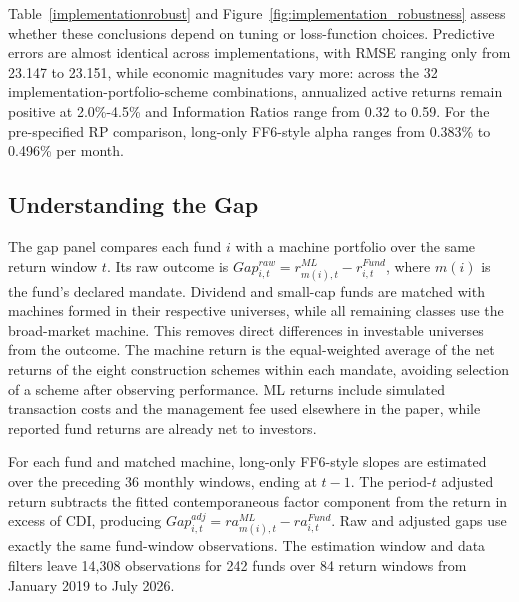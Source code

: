 \documentclass[preprint,12pt,authoryear]{elsarticle}
\begin{document}
Table~\ref{implementationrobust} and Figure~\ref{fig:implementation_robustness} assess whether these conclusions depend on tuning or loss-function choices. Predictive errors are almost identical across implementations, with RMSE ranging only from 23.147 to 23.151, while economic magnitudes vary more: across the 32 implementation-portfolio-scheme combinations, annualized active returns remain positive at 2.0\%-4.5\% and Information Ratios range from 0.32 to 0.59. For the pre-specified RP comparison, long-only FF6-style alpha ranges from 0.383\% to 0.496\% per month.

\subsection{Understanding the Gap}\label{sec:gap}

The gap panel compares each fund $i$ with a machine portfolio over the same return window $t$. Its raw outcome is $Gap^{raw}_{i,t}=r^{ML}_{m(i),t}-r^{Fund}_{i,t}$, where $m(i)$ is the fund's declared mandate. Dividend and small-cap funds are matched with machines formed in their respective universes, while all remaining classes use the broad-market machine. This removes direct differences in investable universes from the outcome. The machine return is the equal-weighted average of the net returns of the eight construction schemes within each mandate, avoiding selection of a scheme after observing performance. ML returns include simulated transaction costs and the management fee used elsewhere in the paper, while reported fund returns are already net to investors.

For each fund and matched machine, long-only FF6-style slopes are estimated over the preceding 36 monthly windows, ending at $t-1$. The period-$t$ adjusted return subtracts the fitted contemporaneous factor component from the return in excess of CDI, producing $Gap^{adj}_{i,t}=ra^{ML}_{m(i),t}-ra^{Fund}_{i,t}$. Raw and adjusted gaps use exactly the same fund-window observations. The estimation window and data filters leave 14,308 observations for 242 funds over 84 return windows from January 2019 to July 2026.
\end{document}
